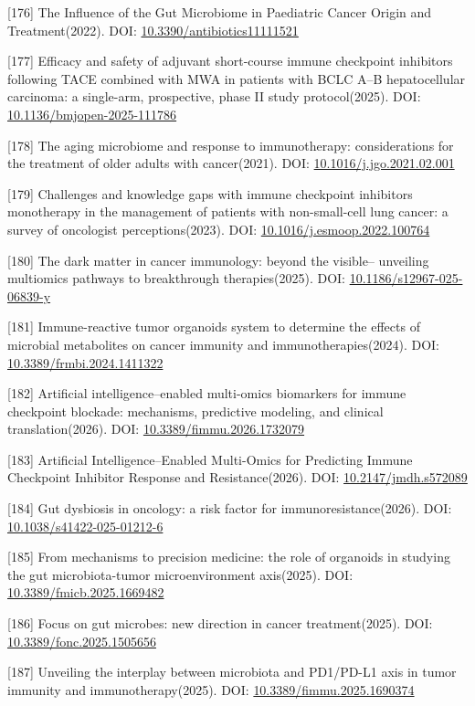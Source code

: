 \documentclass[11pt]{article}
\begin{document}
{[}176{]} The Influence of the Gut Microbiome in Paediatric Cancer Origin and Treatment(2022). DOI: \url{10.3390/antibiotics11111521}

{[}177{]} Efficacy and safety of adjuvant short-course immune checkpoint inhibitors following TACE combined with MWA in patients with BCLC A--B hepatocellular carcinoma: a single-arm, prospective, phase II study protocol(2025). DOI: \url{10.1136/bmjopen-2025-111786}

{[}178{]} The aging microbiome and response to immunotherapy: considerations for the treatment of older adults with cancer(2021). DOI: \url{10.1016/j.jgo.2021.02.001}

{[}179{]} Challenges and knowledge gaps with immune checkpoint inhibitors monotherapy in the management of patients with non-small-cell lung cancer: a survey of oncologist perceptions(2023). DOI: \url{10.1016/j.esmoop.2022.100764}

{[}180{]} The dark matter in cancer immunology: beyond the visible-- unveiling multiomics pathways to breakthrough therapies(2025). DOI: \url{10.1186/s12967-025-06839-y}

{[}181{]} Immune-reactive tumor organoids system to determine the effects of microbial metabolites on cancer immunity and immunotherapies(2024). DOI: \url{10.3389/frmbi.2024.1411322}

{[}182{]} Artificial intelligence--enabled multi-omics biomarkers for immune checkpoint blockade: mechanisms, predictive modeling, and clinical translation(2026). DOI: \url{10.3389/fimmu.2026.1732079}

{[}183{]} Artificial Intelligence--Enabled Multi-Omics for Predicting Immune Checkpoint Inhibitor Response and Resistance(2026). DOI: \url{10.2147/jmdh.s572089}

{[}184{]} Gut dysbiosis in oncology: a risk factor for immunoresistance(2026). DOI: \url{10.1038/s41422-025-01212-6}

{[}185{]} From mechanisms to precision medicine: the role of organoids in studying the gut microbiota-tumor microenvironment axis(2025). DOI: \url{10.3389/fmicb.2025.1669482}

{[}186{]} Focus on gut microbes: new direction in cancer treatment(2025). DOI: \url{10.3389/fonc.2025.1505656}

{[}187{]} Unveiling the interplay between microbiota and PD1/PD-L1 axis in tumor immunity and immunotherapy(2025). DOI: \url{10.3389/fimmu.2025.1690374}
\end{document}
